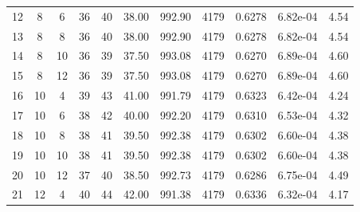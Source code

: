 {\begin{longtable}{|c|c|c|c|c|c|c|c|c|c|c|}
            12           & 8              & 6              & 36                  & 40                   & 38.00                & 992.90            & 4179               & 0.6278               & 6.82e-04         & 4.54            \\
            13           & 8              & 8              & 36                  & 40                   & 38.00                & 992.90            & 4179               & 0.6278               & 6.82e-04         & 4.54            \\
            14           & 8              & 10             & 36                  & 39                   & 37.50                & 993.08            & 4179               & 0.6270               & 6.89e-04         & 4.60            \\
            15           & 8              & 12             & 36                  & 39                   & 37.50                & 993.08            & 4179               & 0.6270               & 6.89e-04         & 4.60            \\ \hline
            16           & 10             & 4              & 39                  & 43                   & 41.00                & 991.79            & 4179               & 0.6323               & 6.42e-04         & 4.24            \\
            17           & 10             & 6              & 38                  & 42                   & 40.00                & 992.20            & 4179               & 0.6310               & 6.53e-04         & 4.32            \\
            18           & 10             & 8              & 38                  & 41                   & 39.50                & 992.38            & 4179               & 0.6302               & 6.60e-04         & 4.38            \\
            19           & 10             & 10             & 38                  & 41                   & 39.50                & 992.38            & 4179               & 0.6302               & 6.60e-04         & 4.38            \\
            20           & 10             & 12             & 37                  & 40                   & 38.50                & 992.73            & 4179               & 0.6286               & 6.75e-04         & 4.49            \\ \hline
            21           & 12             & 4              & 40                  & 44                   & 42.00                & 991.38            & 4179               & 0.6336               & 6.32e-04         & 4.17            \\

\end{longtable}}
